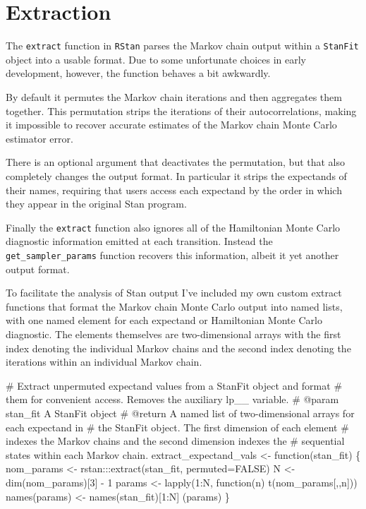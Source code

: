 \documentclass[
  letterpaper,
  DIV=11,
  numbers=noendperiod]{scrartcl}
\newenvironment{Shaded}{\begin{snugshade}}{\end{snugshade}}
\newcommand{\CommentTok}[1]{\textcolor[rgb]{0.37,0.37,0.37}{#1}}
\newcommand{\DecValTok}[1]{\textcolor[rgb]{0.68,0.00,0.00}{#1}}
\newcommand{\NormalTok}[1]{\textcolor[rgb]{0.00,0.23,0.31}{#1}}
\newcommand{\OperatorTok}[1]{\textcolor[rgb]{0.37,0.37,0.37}{#1}}
\begin{document}
\section{Extraction}\label{extraction}

The \texttt{extract} function in \texttt{RStan} parses the Markov chain
output within a \texttt{StanFit} object into a usable format. Due to
some unfortunate choices in early development, however, the function
behaves a bit awkwardly.

By default it permutes the Markov chain iterations and then aggregates
them together. This permutation strips the iterations of their
autocorrelations, making it impossible to recover accurate estimates of
the Markov chain Monte Carlo estimator error.

There is an optional argument that deactivates the permutation, but that
also completely changes the output format. In particular it strips the
expectands of their names, requiring that users access each expectand by
the order in which they appear in the original Stan program.

Finally the \texttt{extract} function also ignores all of the
Hamiltonian Monte Carlo diagnostic information emitted at each
transition. Instead the \texttt{get\_sampler\_params} function recovers
this information, albeit it yet another output format.

To facilitate the analysis of Stan output I've included my own custom
extract functions that format the Markov chain Monte Carlo output into
named lists, with one named element for each expectand or Hamiltonian
Monte Carlo diagnostic. The elements themselves are two-dimensional
arrays with the first index denoting the individual Markov chains and
the second index denoting the iterations within an individual Markov
chain.

\begin{Shaded}
\begin{Highlighting}[]
\CommentTok{\# Extract unpermuted expectand values from a StanFit object and format }
\CommentTok{\# them for convenient access.  Removes the auxiliary \textasciigrave{}lp\_\_\textasciigrave{} variable.}
\CommentTok{\# @param stan\_fit A StanFit object}
\CommentTok{\# @return A named list of two{-}dimensional arrays for each expectand in }
\CommentTok{\#         the StanFit object.  The first dimension of each element }
\CommentTok{\#         indexes the Markov chains and the second dimension indexes the }
\CommentTok{\#         sequential states within each Markov chain. }
\NormalTok{extract\_expectand\_vals }\OperatorTok{\textless{}{-}}\NormalTok{ function(stan\_fit) \{}
\NormalTok{  nom\_params }\OperatorTok{\textless{}{-}}\NormalTok{ rstan:::extract(stan\_fit, permuted}\OperatorTok{=}\NormalTok{FALSE)}
\NormalTok{  N }\OperatorTok{\textless{}{-}}\NormalTok{ dim(nom\_params)[}\DecValTok{3}\NormalTok{] }\OperatorTok{{-}} \DecValTok{1}
\NormalTok{  params }\OperatorTok{\textless{}{-}}\NormalTok{ lapply(}\DecValTok{1}\NormalTok{:N, function(n) t(nom\_params[,,n]))}
\NormalTok{  names(params) }\OperatorTok{\textless{}{-}}\NormalTok{ names(stan\_fit)[}\DecValTok{1}\NormalTok{:N]}
\NormalTok{  (params)}
\NormalTok{\}}
\end{Highlighting}
\end{Shaded}
\end{document}
